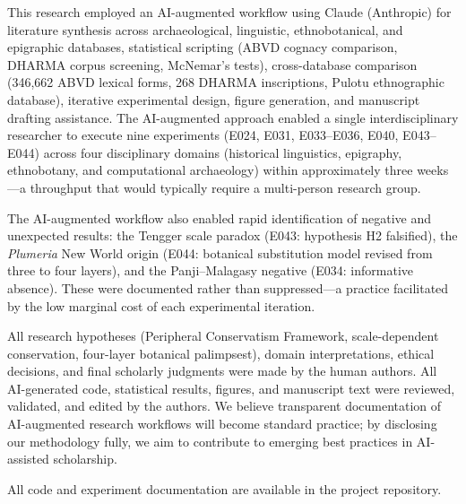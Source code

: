 \documentclass[12pt,a4paper]{article}
\begin{document}
This research employed an AI-augmented workflow using Claude (Anthropic) for literature synthesis across archaeological, linguistic, ethnobotanical, and epigraphic databases, statistical scripting (ABVD cognacy comparison, DHARMA corpus screening, McNemar's tests), cross-database comparison (346,662 ABVD lexical forms, 268 DHARMA inscriptions, Pulotu ethnographic database), iterative experimental design, figure generation, and manuscript drafting assistance. The AI-augmented approach enabled a single interdisciplinary researcher to execute nine experiments (E024, E031, E033--E036, E040, E043--E044) across four disciplinary domains (historical linguistics, epigraphy, ethnobotany, and computational archaeology) within approximately three weeks---a throughput that would typically require a multi-person research group.

The AI-augmented workflow also enabled rapid identification of negative and unexpected results: the Tengger scale paradox (E043: hypothesis H2 falsified), the \emph{Plumeria} New World origin (E044: botanical substitution model revised from three to four layers), and the Panji--Malagasy negative (E034: informative absence). These were documented rather than suppressed---a practice facilitated by the low marginal cost of each experimental iteration.

All research hypotheses (Peripheral Conservatism Framework, scale-dependent conservation, four-layer botanical palimpsest), domain interpretations, ethical decisions, and final scholarly judgments were made by the human authors. All AI-generated code, statistical results, figures, and manuscript text were reviewed, validated, and edited by the authors. We believe transparent documentation of AI-augmented research workflows will become standard practice; by disclosing our methodology fully, we aim to contribute to emerging best practices in AI-assisted scholarship.

All code and experiment documentation are available in the project repository.

\printbibliography
\end{document}
